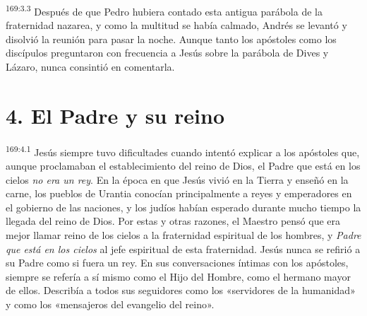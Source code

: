 \par
\textsuperscript{169:3.3} Después de que Pedro hubiera contado esta antigua parábola de la fraternidad nazarea, y como la multitud se había calmado, Andrés se levantó y disolvió la reunión para pasar la noche. Aunque tanto los apóstoles como los discípulos preguntaron con frecuencia a Jesús sobre la parábola de Dives y Lázaro, nunca consintió en comentarla.

\section*{4. El Padre y su reino}
\par
\textsuperscript{169:4.1} Jesús siempre tuvo dificultades cuando intentó explicar a los apóstoles que, aunque proclamaban el establecimiento del reino de Dios, el Padre que está en los cielos \textit{no era un rey}. En la época en que Jesús vivió en la Tierra y enseñó en la carne, los pueblos de Urantia conocían principalmente a reyes y emperadores en el gobierno de las naciones, y los judíos habían esperado durante mucho tiempo la llegada del reino de Dios. Por estas y otras razones, el Maestro pensó que era mejor llamar reino de los cielos a la fraternidad espiritual de los hombres, y \textit{Padre que está en los cielos} al jefe espiritual de esta fraternidad. Jesús nunca se refirió a su Padre como si fuera un rey. En sus conversaciones íntimas con los apóstoles, siempre se refería a sí mismo como el Hijo del Hombre, como el hermano mayor de ellos. Describía a todos sus seguidores como los «servidores de la humanidad» y como los «mensajeros del evangelio del reino».


